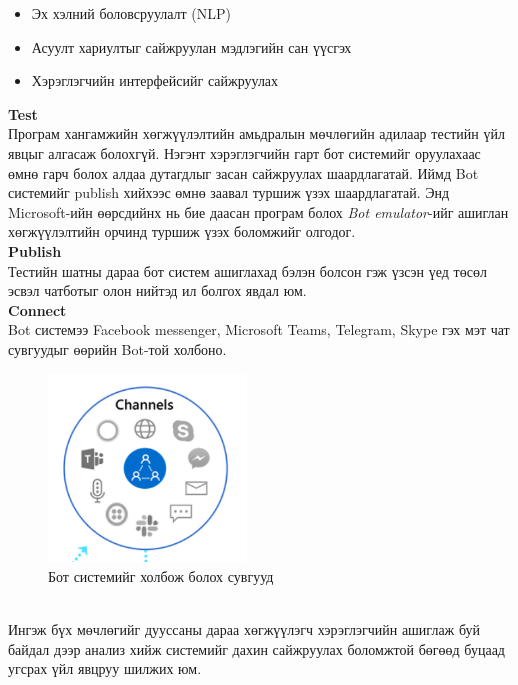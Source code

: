 \begin{itemize}
  \item Эх хэлний боловсруулалт (NLP)
  \item Асуулт хариултыг сайжруулан мэдлэгийн сан үүсгэх
  \item Хэрэглэгчийн интерфейсийг сайжруулах
\end{itemize}
\textbf{Test}
\\Програм хангамжийн хөгжүүлэлтийн амьдралын мөчлөгийн адилаар тестийн үйл явцыг алгасаж болохгүй. Нэгэнт хэрэглэгчийн гарт бот системийг оруулахаас өмнө гарч болох алдаа дутагдлыг засан сайжруулах шаардлагатай.  Иймд Bot системийг publish хийхээс өмнө заавал туршиж үзэх шаардлагатай. Энд Microsoft-ийн өөрсдийнх нь бие даасан програм болох \textit{Bot emulator}-ийг ашиглан хөгжүүлэлтийн орчинд туршиж үзэх боломжийг олгодог. 
\\\textbf{Publish}
\\Тестийн шатны дараа бот систем ашиглахад бэлэн болсон гэж үзсэн үед төсөл эсвэл чатботыг олон нийтэд ил болгох явдал юм. 
\\\textbf{Connect}
\\Bot системээ Facebook messenger, Microsoft Teams, Telegram, Skype гэх мэт чат сувгуудыг өөрийн Bot-той холбоно.
\begin{figure}[h]
  \centering
  \includegraphics*[height=5cm]{images/botConnection.png}
  \caption{Бот системийг холбож болох сувгууд}
\end{figure}
\\Ингэж бүх мөчлөгийг дууссаны дараа хөгжүүлэгч хэрэглэгчийн ашиглаж буй байдал дээр анализ хийж системийг дахин сайжруулах боломжтой бөгөөд буцаад угсрах үйл явцруу шилжих юм. 